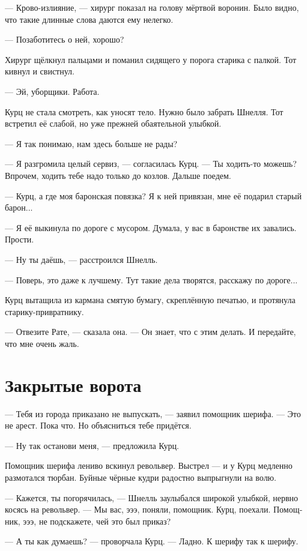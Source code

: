 \documentclass[a4paper,12pt,fleqn]{book}\usepackage{cooltooltips}\usepackage{polyglossia}\setdefaultlanguage[babelshorthands=true]{russian}\setotherlanguage{english}\defaultfontfeatures{Ligatures=TeX,Mapping=tex-text} \usepackage{xcolor}\definecolor{lightgray}{HTML}{bbbbbb}\color{lightgray}\newcommand{\ml}[3]{\textenglish{\textcolor{black}{#3}}}
\begin{document}
--- Крово-излияние, --- хирург показал на голову мёртвой воронин.
Было видно, что такие длинные слова даются ему нелегко.

--- Позаботитесь о ней, хорошо?

Хирург щёлкнул пальцами и поманил сидящего у порога старика с палкой.
Тот кивнул и свистнул.

--- Эй, уборщики.
Работа.

Курц не стала смотреть, как уносят тело.
Нужно было забрать Шнелля.
Тот встретил её слабой, но уже прежней обаятельной улыбкой.

--- Я так понимаю, нам здесь больше не рады?

--- Я разгромила целый сервиз, --- согласилась Курц.
--- Ты ходить-то можешь?
Впрочем, ходить тебе надо только до козлов.
Дальше поедем.

--- Курц, а где моя баронская повязка?
Я к ней привязан, мне её подарил старый барон...

--- Я её выкинула по дороге с мусором.
Думала, у вас в баронстве их завались.
Прости.

--- Ну ты даёшь, --- расстроился Шнелль.

--- Поверь, это даже к лучшему.
Тут такие дела творятся, расскажу по дороге...

Курц вытащила из кармана смятую бумагу, скреплённую печатью, и протянула старику-привратнику.

--- Отвезите Рате, --- сказала она.
--- Он знает, что с этим делать.
И передайте, что мне очень жаль.

\section{Закрытые ворота}

--- Тебя из города приказано не выпускать, --- заявил помощник шерифа.
--- Это не арест.
Пока что.
Но объясниться тебе придётся.

--- Ну так останови меня, --- предложила Курц.

Помощник шерифа лениво вскинул револьвер.
Выстрел --- и у Курц медленно размотался тюрбан.
Буйные чёрные кудри радостно выпрыгнули на волю.

--- Кажется, ты погорячилась, --- Шнелль заулыбался широкой улыбкой, нервно косясь на револьвер.
--- Мы вас, эээ, поняли, помощник.
Курц, поехали.
Помощник, эээ, не подскажете, чей это был приказ?

--- А ты как думаешь? --- проворчала Курц.
--- Ладно.
К шерифу так к шерифу.
\end{document}
